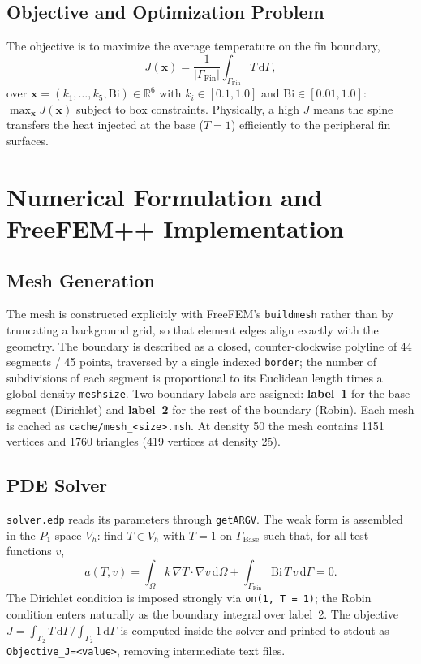 \documentclass[11pt,a4paper]{article}
\begin{document}
\subsection{Objective and Optimization Problem}
The objective is to maximize the average temperature on the fin boundary,
\begin{equation}
J(\mathbf{x})=\frac{1}{|\Gamma_{\text{Fin}}|}\int_{\Gamma_{\text{Fin}}}T\,\mathrm{d}\Gamma,
\end{equation}
over $\mathbf{x}=(k_1,\dots,k_5,\mathrm{Bi})\in\mathbb{R}^6$ with $k_i\in[0.1,1.0]$ and
$\mathrm{Bi}\in[0.01,1.0]$: $\max_{\mathbf{x}}J(\mathbf{x})$ subject to box constraints. Physically,
a high $J$ means the spine transfers the heat injected at the base ($T=1$) efficiently to the
peripheral fin surfaces.

\section{Numerical Formulation and FreeFEM++ Implementation}
\subsection{Mesh Generation}
The mesh is constructed explicitly with FreeFEM's \texttt{buildmesh} rather than by truncating a
background grid, so that element edges align exactly with the geometry. The boundary is described
as a closed, counter-clockwise polyline of 44 segments / 45 points, traversed by a single indexed
\texttt{border}; the number of subdivisions of each segment is proportional to its Euclidean length
times a global density \texttt{meshsize}. Two boundary labels are assigned: \textbf{label~1} for the
base segment (Dirichlet) and \textbf{label~2} for the rest of the boundary (Robin). Each mesh is
cached as \texttt{cache/mesh\_<size>.msh}. At density 50 the mesh contains 1151 vertices and
1760 triangles (419 vertices at density 25).

\subsection{PDE Solver}
\texttt{solver.edp} reads its parameters through \texttt{getARGV}. The weak form is assembled in the
$P_1$ space $V_h$: find $T\in V_h$ with $T=1$ on $\Gamma_{\text{Base}}$ such that, for all test
functions $v$,
\begin{equation}
a(T,v)=\int_\Omega k\,\nabla T\cdot\nabla v\,\mathrm{d}\Omega
+\int_{\Gamma_{\text{Fin}}}\mathrm{Bi}\,T\,v\,\mathrm{d}\Gamma=0.
\end{equation}
The Dirichlet condition is imposed strongly via \texttt{on(1, T = 1)}; the Robin condition enters
naturally as the boundary integral over label~2. The objective
$J=\int_{\Gamma_2}T\,\mathrm{d}\Gamma/\int_{\Gamma_2}1\,\mathrm{d}\Gamma$ is computed inside the
solver and printed to stdout as \texttt{Objective\_J=<value>}, removing intermediate text files.
\end{document}
